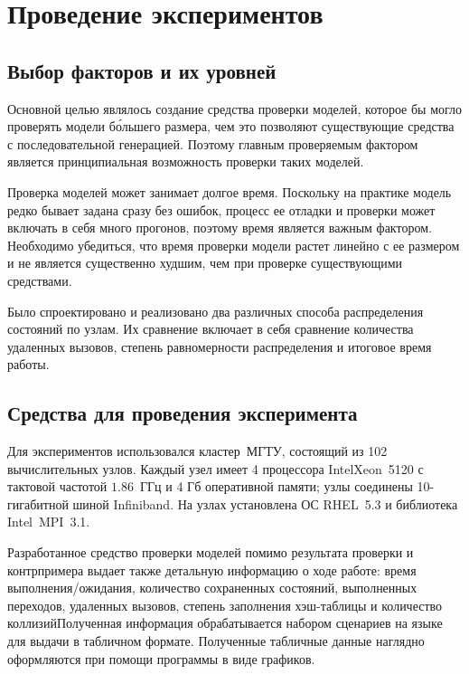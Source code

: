 \chapter{Проведение экспериментов}
\label{cha:experiments}

\section{Выбор факторов и их уровней}
\label{sec:experiment-strategy}

Основной целью являлось создание средства проверки моделей, которое бы могло проверять
модели б\'{о}льшего размера, чем это позволяют существующие средства с последовательной
генерацией. Поэтому главным проверяемым фактором является принципиальная возможность
проверки таких моделей. 

Проверка моделей может занимает долгое время. Поскольку на практике модель редко бывает
задана сразу без ошибок, процесс ее отладки и проверки может включать в себя много
прогонов, поэтому время является важным фактором. Необходимо убедиться, что время проверки
модели растет линейно с ее размером и не является существенно худшим, чем при проверке
существующими средствами.

Было спроектировано и реализовано два различных способа распределения состояний по
узлам. Их сравнение включает в себя сравнение количества удаленных вызовов, степень
равномерности распределения и итоговое время работы.

\section{Средства для проведения эксперимента}
\label{sec:experiment-idef0}

Для экспериментов использовался кластер~МГТУ, состоящий из 102 вычислительных
узлов. Каждый узел имеет 4 процессора Intel\regsign Xeon\regsign~5120 с тактовой частотой
$1.86$~ГГц и 4 Гб оперативной памяти; узлы соединены 10-гигабитной шиной Infiniband. На
узлах установлена ОС RHEL~5.3 и библиотека Intel~MPI~3.1.

Разработанное средство проверки моделей помимо результата проверки и контрпримера выдает
также детальную информацию о ходе работе: время выполнения/ожидания, количество
сохраненных состояний, выполненных переходов, удаленных вызовов, степень заполнения
хэш-таблицы и количество коллизий\etc Полученная информация обрабатывается набором
сценариев на языке  для выдачи в табличном формате. Полученные табличные
данные наглядно оформляются при помощи программы  в виде графиков.

